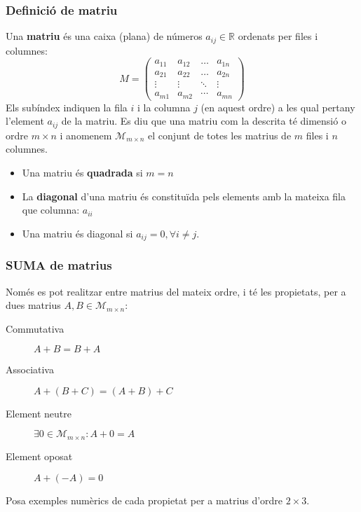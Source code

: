 \documentclass{beamer}
\begin{document}
\begin{frame}
\frametitle{Definició de matriu}
Una {\bf matriu} és una caixa (plana) de números $a_{ij}\in \mathbb{R}$ ordenats per files i columnes:
\[
M=
\begin{pmatrix}
  a_{11} & a_{12} & \ldots & a_{1n}\\
  a_{21} & a_{22} & \ldots & a_{2n}\\
  \vdots & \vdots & \ddots & \vdots\\
  a_{m1} & a_{m2} & \cdots & a_{mn}
\end{pmatrix}
\]
Els subíndex indiquen la fila $i$ i la columna $j$ (en aquest ordre) a les qual pertany l'element $a_{ij}$ de la matriu. Es diu que una matriu com la descrita té dimensió o ordre $m \times n$ i anomenem $\mathscr{M}_{m\times n}$ el conjunt de totes les matrius de $m$ files i $n$ columnes.
\end{frame}




\begin{frame}
\begin{itemize}
  \item Una matriu és {\bf quadrada} si $m=n$
  \item La {\bf diagonal} d'una matriu és constituïda pels elements amb la mateixa fila que columna: $a_{ii}$
  \item Una matriu és diagonal si $a_{ij} = 0, \forall i\neq j$.
\end{itemize}
\end{frame}

\begin{frame}
\frametitle{SUMA de matrius}
Només es pot realitzar entre matrius del mateix ordre, i té les propietats, per a dues matrius $A,B \in \mathscr{M}_{m\times n}$:
\begin{description}
  \item[Commutativa] $A+B=B+A$
  \item[Associativa] $A+(B+C) = (A+B)+C$
  \item[Element neutre] $\exists 0 \in \mathscr{M}_{m\times n}: A+0=A$
  \item[Element oposat] $A+(-A)=0$
\end{description}
\begin{exercici}{}
  Posa exemples numèrics de cada propietat per a matrius d'ordre $2 \times 3$.
\end{exercici}
\end{frame}
\end{document}
